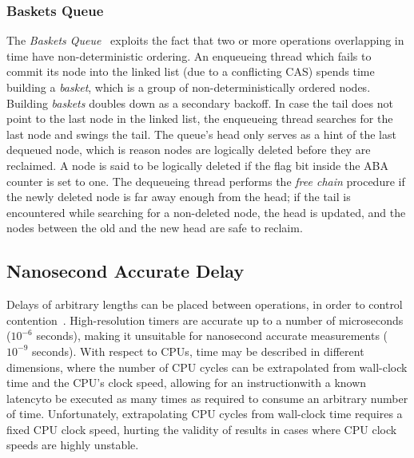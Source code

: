 \subsubsection{Baskets Queue}
The \emph{Baskets Queue}~\citep{hoffman2007baskets} exploits the fact that two or
more operations overlapping in time have non-deterministic ordering. An
enqueueing thread which fails to commit its node into the linked list (due to
a conflicting CAS) spends time building a \emph{basket}, which is a group of
non-deterministically ordered nodes. Building \emph{baskets} doubles down as a secondary
backoff. In case the tail does not point to the last node in the linked list,
the enqueueing thread searches for the last node and swings the tail. The queue's head
only serves as a hint of the last dequeued node, which is reason nodes are
logically deleted before they are reclaimed. A node is said to be logically
deleted if the flag bit inside the ABA counter is set to one. The dequeueing thread
performs the \emph{free chain} procedure if the newly deleted node is far away
enough from the head; if the tail is encountered while searching for a
non-deleted node, the head is updated, and the nodes between the old and the
new head are safe to reclaim.

\subsection{Nanosecond Accurate Delay}
Delays of arbitrary lengths can be placed between operations, in order to
control contention~\citep{valois1994queues}. High-resolution timers are
accurate up to a number of microseconds ($10^{-6}$ seconds), making it
unsuitable for nanosecond accurate measurements ($10^{-9}$ seconds). 
With respect to CPUs, time may be described in different dimensions, where the
number of CPU cycles can be extrapolated from wall-clock time and the CPU's
clock speed, allowing for an instruction\textemdash with a known
latency\textemdash to be executed as many times as required to consume an
arbitrary number of time. Unfortunately, extrapolating CPU cycles from
wall-clock time requires a fixed CPU clock speed, hurting the validity of
results in cases where CPU clock speeds are highly unstable.

